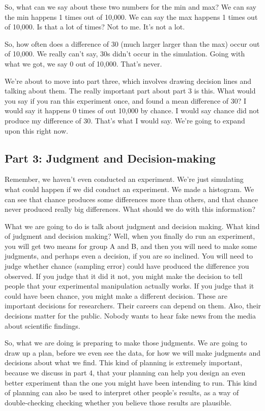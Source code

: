 \documentclass[
  letterpaper,
  DIV=11,
  numbers=noendperiod]{scrreprt}
\begin{document}
So, what can we say about these two numbers for the min and max? We can
say the min happens 1 times out of 10,000. We can say the max happens 1
times out of 10,000. Is that a lot of times? Not to me. It's not a lot.

So, how often does a difference of 30 (much larger larger than the max)
occur out of 10,000. We really can't say, 30s didn't occur in the
simulation. Going with what we got, we say 0 out of 10,000. That's
never.

We're about to move into part three, which involves drawing decision
lines and talking about them. The really important part about part 3 is
this. What would you say if you ran this experiment once, and found a
mean difference of 30? I would say it happens 0 times of out 10,000 by
chance. I would say chance did not produce my difference of 30. That's
what I would say. We're going to expand upon this right now.

\subsection{Part 3: Judgment and
Decision-making}\label{part-3-judgment-and-decision-making}

Remember, we haven't even conducted an experiment. We're just simulating
what could happen if we did conduct an experiment. We made a histogram.
We can see that chance produces some differences more than others, and
that chance never produced really big differences. What should we do
with this information?

What we are going to do is talk about judgment and decision making. What
kind of judgment and decision making? Well, when you finally do run an
experiment, you will get two means for group A and B, and then you will
need to make some judgments, and perhaps even a decision, if you are so
inclined. You will need to judge whether chance (sampling error) could
have produced the difference you observed. If you judge that it did it
not, you might make the decision to tell people that your experimental
manipulation actually works. If you judge that it could have been
chance, you might make a different decision. These are important
decisions for researchers. Their careers can depend on them. Also, their
decisions matter for the public. Nobody wants to hear fake news from the
media about scientific findings.

So, what we are doing is preparing to make those judgments. We are going
to draw up a plan, before we even see the data, for how we will make
judgments and decisions about what we find. This kind of planning is
extremely important, because we discuss in part 4, that your planning
can help you design an even better experiment than the one you might
have been intending to run. This kind of planning can also be used to
interpret other people's results, as a way of double-checking checking
whether you believe those results are plausible.
\end{document}
